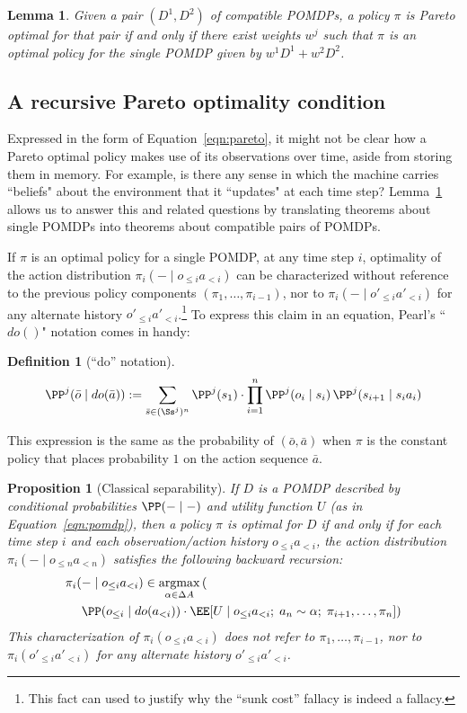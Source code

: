 \documentclass{article}  %
\newcommand{\seq}{\bar}
\newcommand{\hist}[1]{o_{\le #1}a_{<#1}}
\newcommand{\althist}[1]{o'_{\le #1}a'_{<#1}}
\newcommand{\dohist}[1]{o_{\le #1} \mid do(a_{<#1})}
\newcommand{\eqn}[1]{Equation~\ref{eqn:#1}}
\newcommand{\lem}[1]{Lemma~\ref{lem:#1}}
\DeclareMathOperator*{\argmax}{argmax}
\newtheorem{proposition}[theorem]{Proposition}
\newtheorem{lemma}[theorem]{Lemma}
\newtheorem{definition}[theorem]{Definition}
\begin{document}
\begin{lemma}\label{lem:mixture}
Given a pair $(D^1,D^2)$ of compatible POMDPs, a policy $\pi$ is Pareto optimal for that pair if and only if there exist weights $w^j$ such that $\pi$ is an optimal policy for the single POMDP given by $w^1D^1+w^2D^2$.  
\end{lemma}

\subsection{A recursive Pareto optimality condition}

Expressed in the form of \eqn{pareto}, it might not be clear how a Pareto optimal policy makes use of its observations over time, aside from storing them in memory.  For example, is there any sense in which the machine carries ``beliefs" about the environment that it ``updates" at each time step?  \lem{mixture} allows us to answer this and related questions by translating theorems about single POMDPs into theorems about compatible pairs of POMDPs.  

If $\pi$ is an optimal policy for a single POMDP, at any time step $i$, optimality of the action distribution $\pi_i(-\mid\hist{i})$ can be characterized without reference to the previous policy components 
$(\pi_1,\ldots,\pi_{i-1})$, nor to $\pi_i(-\mid\althist{i})$ for any alternate history $\althist{i}$.\footnote{This fact can used to justify why the ``sunk cost'' fallacy is indeed a fallacy.}   To express this claim in an equation, Pearl's ``$do()$" notation \citep{pearl2009causality} comes in handy:
\begin{definition}[``do'' notation]
\[
\PP^j(\seq o \mid do(\seq a)) := \sum_{\seq s \in (\Ss^j)^n} \PP^j(s_1) \cdot \prod_{i=1}^n
\PP^j(o_i \mid s_i)\, \PP^j(s_{i+1} \mid s_ia_i)
\]
\end{definition}

This expression is the same as the probability of $(\seq o, \seq a)$ when $\pi$ is the constant policy that places probability $1$ on the action sequence $\seq a$.

\begin{proposition}[Classical separability]\label{prop:separability}
If $D$ is a POMDP described by conditional probabilities $\PP(-\mid -)$ and utility function $U$ (as in \eqn{pomdp}), then a policy $\pi$ is optimal for $D$ if and only if for each time step $i$ and each observation/action history $\hist{i}$, the action distribution $\pi_i(-\mid \hist{n})$ satisfies the following backward recursion:
\begin{align*}
& \pi_i(-\mid\hist{i}) \in \argmax_{\alpha\in\Delta A} \left(\vphantom{\left(()\right)}\right.\\
& \left.\quad \PP(\dohist{i})\cdot \EE[U \mid \hist{i} ;\; a_n\sim \alpha; \; \pi_{i+1},\ldots,\pi_{n}]\right)
\end{align*}
This characterization of $\pi_i(\hist{i})$ does not refer to $\pi_1,\ldots,\pi_{i-1}$, nor to 
$\pi_i(\althist{i})$ for any alternate history $\althist{i}$.
\end{proposition}
\end{document}
